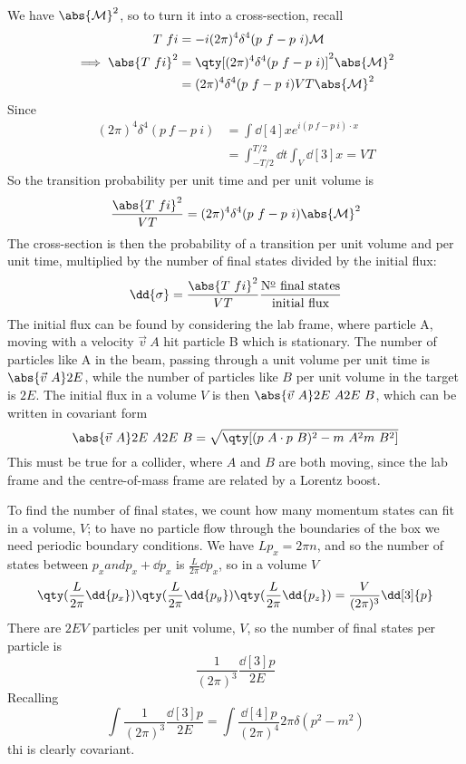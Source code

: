 We have $\abs{\mathcal{M}}^2$, so to turn it into a cross-section,
recall
\begin{align*}
  T~{fi} &= -i (2 \pi)^4 \delta^4(p~f - p~i) \mathcal{M} \\
\implies \abs{T~{fi}}^2 &= \qty[(2 \pi)^4 \delta^4(p~f - p~i)]^2 \abs{\mathcal{M}}^2 \\
&= (2 \pi)^4 \delta^4(p~f - p~i) VT \abs{\mathcal{M}}^2
\end{align*}
Since
\begin{align*} (2 \pi)^4 \delta^4(p~f-p~i) &= \int \dd[4]{x} e^{i(p~f-p~i)\cdot x} \\
&= \int_{-T/2}^{T/2} \dd{t} \int_V \dd[3]{x} = VT 
\end{align*}
So the transition probability per unit time and per unit volume is
\begin{equation}
  \frac{\abs{T~{fi}}^2}{VT} = (2 \pi)^4 \delta^4(p~f - p~i) \abs{\mathcal{M}}^2
\end{equation}
The cross-section is then the probability of a transition per unit
volume and per unit time, multiplied by the number of final states
divided by the initial flux:
\[ \dd{\sigma} = \frac{\abs{T~{fi}}^2}{VT}
\frac{\text{N$^{{\text{\underline{o}}}}$ final states}}{\text{initial
    flux}} \]
The initial flux can be found by considering the lab frame, where
particle A, moving with a velocity $\vec{v}~A$ hit particle B which is
stationary. The number of particles like A in the beam, passing
through a unit volume per unit time is $\abs{\vec{v}~A} 2 E$, while
the number of particles like $B$ per unit volume in the target is
$2E$. The initial flux in a volume $V$ is then
$\abs{\vec{v}~A} 2E~A 2 E~B$, which can be written in covariant form
\[ \abs{\vec{v}~A} 2E~A 2E~B = \sqrt{\qty[(p~A \cdot p~B)^2 - m~A^2
  m~B^2]} \]
This must be true for a collider, where $A$ and $B$ are both moving,
since the lab frame and the centre-of-mass frame are related by a
Lorentz boost.

To find the number of final states, we count how many momentum states
can fit in a volume, $V$; to have no particle flow through the
boundaries of the box we need periodic boundary conditions. We have
$L p_x = 2 \pi n$, and so the number of states between
$p_x and p_x + \dd{p_x}$ is $ \frac{L}{2\pi} \dd{p_x}$, so in a volume
$V$
\[ \qty( \frac{L}{2 \pi} \dd{p_x} ) \qty( \frac{L}{2 \pi} \dd{p_y})
\qty( \frac{L}{2 \pi} \dd{p_z}) = \frac{V}{(2 \pi)^3} \dd[3]{p} \]
There are $2EV$ particles per unit volume, $V$, so the number of final
states per particle is
\[ \frac{1}{(2 \pi)^3}\frac{\dd[3]{p}}{2E} \]
Recalling
\[ \int \frac{1}{(2 \pi)^3} \frac{\dd[3]{p}}{2E} = \int
\frac{\dd[4]{p}}{(2 \pi)^4} 2\pi \delta(p^2-m^2) \]
thi is clearly covariant.

